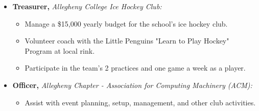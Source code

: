 \documentclass[11pt,a4paper,sans]{moderncv}
\begin{document}
\begin{itemize} %
\item \textbf{Treasurer,} \textit{Allegheny College Ice Hockey Club:}
\begin{itemize} %
  \item Manage a \$15,000 yearly budget for the school's ice hockey club.
  \item Volunteer coach with the Little Penguins "Learn to Play Hockey" Program at local rink.
  \item Participate in the team's 2 practices and one game a week as a player.
\end{itemize} %

\vspace{2pt}

\item \textbf{Officer,} \textit{Allegheny Chapter - Association for Computing Machinery (ACM): }
\begin{itemize} %
  \item Assist with event planning, setup, management, and other club activities.
\end{itemize} %
\end{itemize} %
\end{document}
